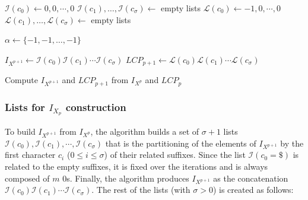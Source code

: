 \documentclass[a4paper,12pt, oneside]{article}
\begin{document}
\begin{algorithm}[tb!]
 
	$\mathcal{I}(c_0) \gets 0,0, \cdots, 0$\;
	$\mathcal{I}(c_1), \ldots, \mathcal{I}(c_{\sigma}) \gets $ empty lists\;
	$\mathcal{L}(c_0) \gets -1,0, \cdots, 0$\;
	$\mathcal{L}(c_1), \ldots, \mathcal{L}(c_{\sigma}) \gets $ empty lists\;

  
  $\alpha \gets \{-1,-1, \ldots, -1\}$\;\label{alg:compute-by-offset-with-lcp-init-alpha}
  
  $I_{X^{p+1}} \gets \mathcal{I}(c_0) \mathcal{I}(c_1) \cdots \mathcal{I}(c_{\sigma})$\;
  $LCP_{p+1} \gets \mathcal{L}(c_0) \mathcal{L}(c_1) \cdots \mathcal{L}(c_{\sigma})$\;\label{alg:compute-by-offset-with-lcp-concat}

\caption{Compute $I_{X^{p+1}}$ and $LCP_{p+1}$ from $I_{X^{p}}$ and $LCP_{p}$}
\label{alg:compute-by-offset-with-lcp}
\end{algorithm}

\subsubsection{Lists for $I_{X_p}$ construction}

To build $I_{X^{p+1}}$ from $I_{X^p}$, the algorithm builds a set of $\sigma+1$ lists \linebreak $\mathcal{I}(c_0), \mathcal{I}(c_1), \cdots, \mathcal{I}(c_{\sigma})$ that is the partitioning of the elements of $I_{X^{p+1}}$ by the first character $c_i$ ($0 \leq i \leq \sigma$) of their related suffixes.
Since the list $\mathcal{I}(c_0=\$)$ is related to the empty suffixes, it is fixed over the iterations and is always composed of $m$ $0$s. Finally, the algorithm produces $I_{X^{p+1}}$ as the concatenation $\mathcal{I}(c_0) \mathcal{I}(c_1) \cdots \mathcal{I}(c_{\sigma})$. The rest of the lists (with $\sigma > 0$) is created as follows:
\end{document}
